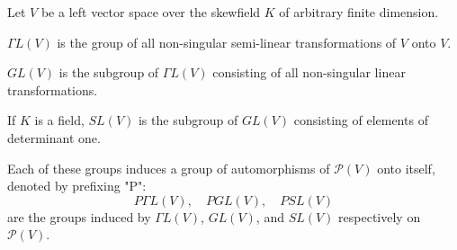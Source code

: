 Let $V$ be a left vector space over the skewfield $K$ of arbitrary finite dimension.

$\Gamma L(V)$ is the group of all non-singular semi-linear transformations of $V$ onto $V$.

$GL(V)$ is the subgroup of $\Gamma L(V)$ consisting of all non-singular linear transformations.

If $K$ is a field, $SL(V)$ is the subgroup of $GL(V)$ consisting of elements of determinant one.

Each of these groups induces a group of automorphisms of $\mathcal{P}(V)$ onto itself, denoted by prefixing "P":
$$P\Gamma L(V),\quad PGL(V),\quad PSL(V)$$
are the groups induced by $\Gamma L(V)$, $GL(V)$, and $SL(V)$ respectively on $\mathcal{P}(V)$.
